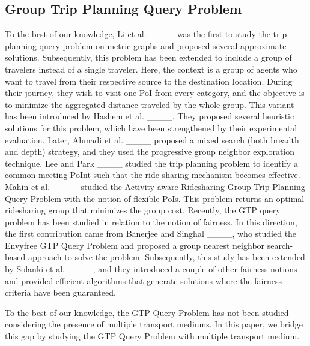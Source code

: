 \subsection{Group Trip Planning Query Problem}
To the best of our knowledge, Li et al. ____ was the first to study the trip planning query problem on metric graphs and proposed several approximate solutions. Subsequently, this problem has been extended to include a group of travelers instead of a single traveler. Here, the context is a group of agents who want to travel from their respective source to the destination location. During their journey, they wish to visit one PoI from every category, and the objective is to minimize the aggregated distance traveled by the whole group. This variant has been introduced by Hashem et al. ____. They proposed several heuristic solutions for this problem, which have been strengthened by their experimental evaluation. Later, Ahmadi et al. ____ proposed a mixed search (both breadth and depth) strategy, and they used the progressive group neighbor exploration technique. Lee and Park  ____ studied the trip planning problem to identify a common meeting PoInt such that the ride-sharing mechanism becomes effective. Mahin et al. ____ studied the Activity-aware Ridesharing Group Trip Planning Query Problem with the notion of flexible PoIs. This problem returns an optimal ridesharing group that minimizes the group cost. Recently, the GTP query problem has been studied in relation to the notion of fairness. In this direction, the first contribution came from Banerjee and Singhal ____, who studied the Envyfree GTP Query Problem and proposed a group nearest neighbor search-based approach to solve the problem. Subsequently, this study has been extended by Solanki et al. ____, and they introduced a couple of other fairness notions and provided efficient algorithms that generate solutions where the fairness criteria have been guaranteed.
\par To the best of our knowledge, the GTP Query Problem has not been studied considering the presence of multiple transport mediums. In this paper, we bridge this gap by studying the GTP Query Problem with multiple transport medium.